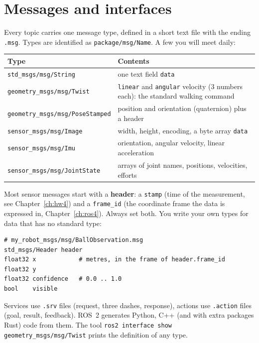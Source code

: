 \section*{Messages and interfaces}
Every topic carries one message type, defined in a short text file with the ending \verb!.msg!. Types are identified as \verb!package/msg/Name!. A few you will meet daily:
\begin{center}
\renewcommand{\arraystretch}{1.25}
\begin{tabular}{p{5.8cm}p{7.0cm}}
\textbf{Type} & \textbf{Contents}\\ \hline
\verb!std_msgs/msg/String! & one text field \verb!data!\\
\verb!geometry_msgs/msg/Twist! & \verb!linear! and \verb!angular! velocity (3 numbers each): the standard walking command\\
\verb!geometry_msgs/msg/PoseStamped! & position and orientation (quaternion) plus a header\\
\verb!sensor_msgs/msg/Image! & width, height, encoding, a byte array \verb!data!\\
\verb!sensor_msgs/msg/Imu! & orientation, angular velocity, linear acceleration\\
\verb!sensor_msgs/msg/JointState! & arrays of joint names, positions, velocities, efforts\\
\end{tabular}
\end{center}
Most sensor messages start with a \textbf{header}: a \verb!stamp! (time of the measurement, see Chapter~\ref{ch:hw4}) and a \verb!frame_id! (the coordinate frame the data is expressed in, Chapter~\ref{ch:ros4}). Always set both. You write your own types for data that has no standard type:
\begin{verbatim}
# my_robot_msgs/msg/BallObservation.msg
std_msgs/Header header
float32 x            # metres, in the frame of header.frame_id
float32 y
float32 confidence   # 0.0 .. 1.0
bool    visible
\end{verbatim}
Services use \verb!.srv! files (request, three dashes, response), actions use \verb!.action! files (goal, result, feedback). ROS~2 generates Python, C++ (and with extra packages Rust) code from them. The tool \verb!ros2 interface show geometry_msgs/msg/Twist! prints the definition of any type.

